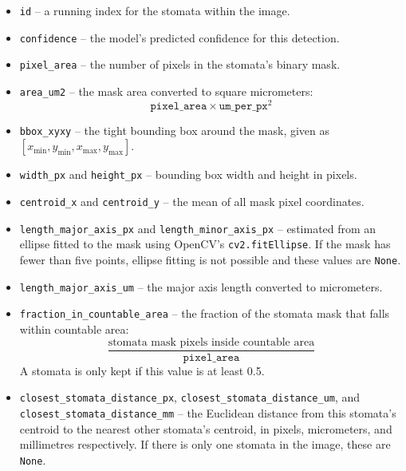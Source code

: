 \documentclass{article}
\begin{document}
\begin{itemize}
    \item \texttt{id} -- a running index for the stomata within the image.

    \item \texttt{confidence} -- the model's predicted confidence for this detection.

    \item \texttt{pixel\_area} -- the number of pixels in the stomata's binary mask.

    \item \texttt{area\_um2} -- the mask area converted to square micrometers:
    \[
    \texttt{pixel\_area} \times \texttt{um\_per\_px}^2
    \]

    \item \texttt{bbox\_xyxy} -- the tight bounding box around the mask, given as $[x_{\min}, y_{\min}, x_{\max}, y_{\max}]$.

    \item \texttt{width\_px} and \texttt{height\_px} -- bounding box width and height in pixels.

    \item \texttt{centroid\_x} and \texttt{centroid\_y} -- the mean of all mask pixel coordinates.

    \item \texttt{length\_major\_axis\_px} and \texttt{length\_minor\_axis\_px} -- estimated from an ellipse fitted to the mask using OpenCV's \texttt{cv2.fitEllipse}. If the mask has fewer than five points, ellipse fitting is not possible and these values are \texttt{None}.

    \item \texttt{length\_major\_axis\_um} -- the major axis length converted to micrometers.

    \item \texttt{fraction\_in\_countable\_area} -- the fraction of the stomata mask that falls within countable area:
    \[
    \frac{\text{stomata mask pixels inside countable area}}{\texttt{pixel\_area}}
    \]
    A stomata is only kept if this value is at least 0.5.

    \item \texttt{closest\_stomata\_distance\_px}, \texttt{closest\_stomata\_distance\_um}, and \texttt{closest\_stomata\_distance\_mm} -- the Euclidean distance from this stomata's centroid to the nearest other stomata's centroid, in pixels, micrometers, and millimetres respectively. If there is only one stomata in the image, these are \texttt{None}.
\end{itemize}
\end{document}
